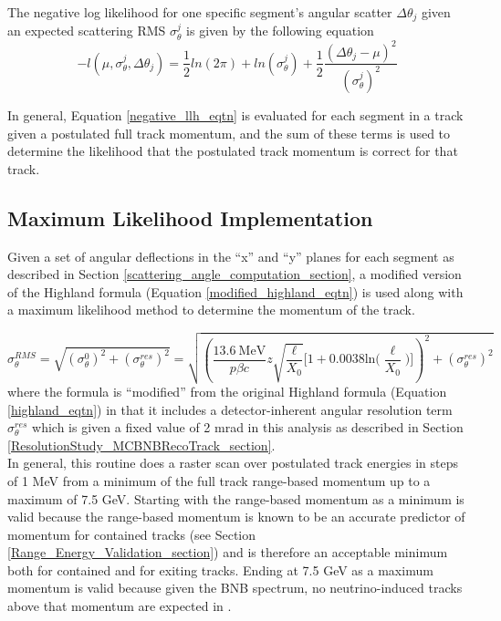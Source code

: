The negative log likelihood for one specific segment's angular scatter $\Delta\theta_j$ given an expected scattering RMS $\sigma_\theta^j$ is given by the following equation
\begin{equation}\label{negative_llh_eqtn}
-l(\mu, \sigma_\theta^j, \Delta\theta_j) = \frac{1}{2}ln(2\pi) + ln(\sigma_\theta^j) + \frac{1}{2}\frac{(\Delta\theta_j-\mu)^2}{(\sigma_\theta^j)^2}
\end{equation}

In general, Equation \ref{negative_llh_eqtn} is evaluated for each segment in a track given a postulated full track momentum, and the sum of these terms is used to determine the likelihood that the postulated track momentum is correct for that track.


\subsection{Maximum Likelihood Implementation}\label{maximum_likelihood_section}

Given a set of angular deflections in the ``x'' and ``y'' planes for each segment as described in Section \ref{scattering_angle_computation_section}, a modified version of the Highland formula (Equation \ref{modified_highland_eqtn}) is used along with a maximum likelihood method to determine the momentum of the track. 

\begin{equation}\label{modified_highland_eqtn}
\sigma_{\theta}^{RMS} = \sqrt{ (\sigma_\theta^0)^2 + (\sigma_\theta^{res})^2} = \sqrt{ (\frac{13.6\  \text{MeV}}{p\beta c}z\sqrt{\frac{\ell}{X_0}}\Big[1+0.0038\text{ln}\Big(\frac{\ell}{X_0}\Big)\Big])^2 + (\sigma_\theta^{res})^2 }
\end{equation}
where the formula is ``modified'' from the original Highland formula (Equation \ref{highland_eqtn}) in that it includes a detector-inherent angular resolution term $\sigma_\theta^{res}$ which is given a fixed value of 2 mrad in this analysis as described in Section \ref{ResolutionStudy_MCBNBRecoTrack_section}\cite{leonidas2}.\\

In general, this routine does a raster scan over postulated track energies in steps of 1 MeV from a minimum of the full track range-based momentum up to a maximum of 7.5 GeV. Starting with the range-based momentum as a minimum is valid because the range-based momentum is known to be an accurate predictor of momentum for contained tracks (see Section \ref{Range_Energy_Validation_section}) and is therefore an acceptable minimum both for contained and for exiting tracks. Ending at 7.5 GeV as a maximum momentum is valid because given the BNB spectrum, no neutrino-induced tracks above that momentum are expected in {\ub}.\\

